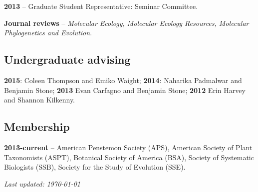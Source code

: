 \documentclass[]{article}
\begin{document}
\textbf{2013} -- Graduate Student Representative: Seminar Committee.

\textbf{Journal reviews} -- \emph{Molecular Ecology, Molecular Ecology Resources, Molecular Phylogenetics and
Evolution}.

\newpage

\subsection{\texorpdfstring{\textbf{Undergraduate advising}}{Undergraduate advising}}\label{undergraduate-advising}

\textbf{2015}: Coleen Thompson and Emiko Waight; \textbf{2014}: Naharika Padmalwar and Benjamin Stone; \textbf{2013} Evan Carfagno and Benjamin Stone; \textbf{2012} Erin Harvey and Shannon Kilkenny.

\subsection{\texorpdfstring{\textbf{Membership}}{Membership}}\label{membership}

\textbf{2013-current} -- American Penstemon Society (APS), American
Society of Plant Taxonomists (ASPT), Botanical Society of America (BSA),
Society of Systematic Biologists (SSB), Society for the Study of
Evolution (SSE).

\vspace{0.25in}
\hfill {\small \itshape Last updated: \mydate\today}
\end{document}
